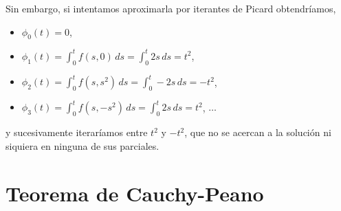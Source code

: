 \documentclass[11pt]{article}
\theoremstyle{plain}
\theoremstyle{definition}
\theoremstyle{remark}
\begin{document}
Sin embargo, si intentamos aproximarla por iterantes de Picard
obtendríamos,
\begin{itemize}
\item $\phi_0(t) = 0$,
\item $\displaystyle\phi_1(t) = \int_0^t f(s,0)\,ds = \int_0^t 2s\,ds = t^2$,
\item $\displaystyle\phi_2(t) = \int_0^t f(s,s^2)\,ds = \int_0^t -2s\,ds = -t^2$,
\item $\displaystyle\phi_3(t) = \int_0^t f(s,-s^2)\,ds = \int_0^t 2s\,ds = t^2$, $\dots$
\end{itemize}
y sucesivamente iteraríamos entre $t^2$ y $-t^2$, que no se acercan
a la solución ni siquiera en ninguna de sus parciales.


\section{Teorema de Cauchy-Peano}



\end{document}
